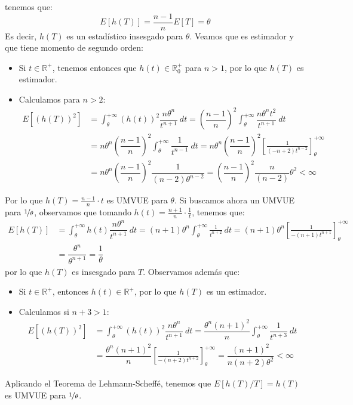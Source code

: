 \begin{ejercicio}
    tenemos que:
    \begin{equation*}
        E[h(T)] = \dfrac{n-1}{n}E[T] = \theta
    \end{equation*}
    Es decir, $h(T)$ es un estadístico insesgado para $\theta$. Veamos que es estimador y que tiene momento de segundo orden:
    \begin{itemize}
        \item Si $t\in \mathbb{R}^+$, tenemos entonces que $h(t) \in \mathbb{R}^+_0$ para $n>1$, por lo que $h(T)$ es estimador.
        \item Calculamos para $n>2$:
            \begin{align*}
                E[{(h(T))}^{2}] &= \int_{\theta}^{+\infty} {(h(t))}^{2}\dfrac{n\theta^n}{t^{n+1}}~dt  = {\left(\dfrac{n-1}{n}\right)}^{2}\int_{\theta}^{+\infty} \dfrac{n\theta^n t^2}{t^{n+1}}~dt  \\ 
                                &= n\theta^n {\left(\dfrac{n-1}{n}\right)}^{2}\int_{\theta}^{+\infty} \dfrac{1}{t^{n-1}}~dt  = n\theta^n {\left(\dfrac{n-1}{n}\right)}^{2} \left[\frac{1}{(-n+2)t^{n-2}}\right]_\theta^{+\infty} \\
                                &= n\theta^n {\left(\dfrac{n-1}{n}\right)}^{2}\dfrac{1}{(n-2)\theta^{n-2}} = {\left(\dfrac{n-1}{n}\right)}^{2} \dfrac{n}{(n-2)}\theta^2 < \infty
            \end{align*}
    \end{itemize}
    Por lo que $h(T) = \frac{n-1}{n}\cdot t$ es UMVUE para $\theta$. Si buscamos ahora un UMVUE para $\nicefrac{1}{\theta}$, observamos que tomando $h(t) = \frac{n+1}{n}\cdot \frac{1}{t}$, tenemos que:
    \begin{align*}
        E[h(T)] &= \int_{\theta}^{+\infty} h(t) \dfrac{n\theta^n}{t^{n+1}}~dt  = (n+1)\theta^n \int_{\theta}^{+\infty} \frac{1}{t^{n+2}}~dt  = (n+1)\theta^n \left[\frac{1}{-(n+1)t^{n+1}}\right]_\theta^{+\infty} \\
                &= \dfrac{\theta^n}{\theta^{n+1}} = \dfrac{1}{\theta}
    \end{align*}
    por lo que $h(T)$ es insesgado para $T$. Observamos además que:
    \begin{itemize}
        \item Si $t\in \mathbb{R}^+$, entonces $h(t)\in \mathbb{R}^+$, por lo que $h(T)$ es un estimador.
        \item Calculamos si $n+3>1$:
            \begin{align*}
                E[{(h(T))}^{2}] &= \int_{\theta}^{+\infty} {(h(t))}^{2}\dfrac{n\theta^n}{t^{n+1}}~dt  = \dfrac{\theta^n{(n+1)}^{2}}{n}\int_{\theta}^{+\infty} \dfrac{1}{t^{n+3}}~dt  \\
                &= \dfrac{\theta^n{(n+1)}^{2}}{n} \left[\frac{1}{-(n+2)t^{n+2}}\right]_\theta^{+\infty} = \dfrac{{(n+1)}^{2}}{n(n+2)\theta^2} < \infty
            \end{align*}
    \end{itemize}
    Aplicando el Teorema de Lehmann-Scheffé, tenemos que $E[h(T)/T] = h(T)$ es UMVUE para $\nicefrac{1}{\theta}$.
\end{ejercicio}

